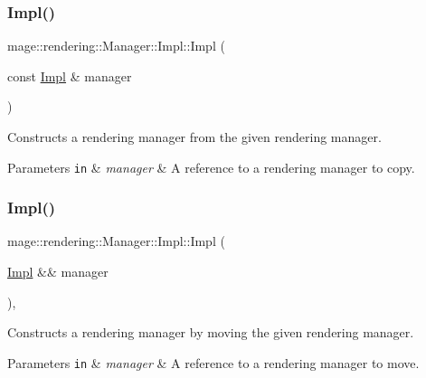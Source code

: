 \subsubsection{\texorpdfstring{Impl()}{Impl()}\hspace{0.1cm}{\footnotesize\ttfamily [2/3]}}
{\footnotesize\ttfamily mage\+::rendering\+::\+Manager\+::\+Impl\+::\+Impl (\begin{DoxyParamCaption}\item[{const \hyperlink{classmage_1_1rendering_1_1_manager_1_1_impl}{Impl} \&}]{manager }\end{DoxyParamCaption})\hspace{0.3cm}{\ttfamily [delete]}}

Constructs a rendering manager from the given rendering manager.


\begin{DoxyParams}[1]{Parameters}
\mbox{\tt in}  & {\em manager} & A reference to a rendering manager to copy. \\
\hline
\end{DoxyParams}
\hypertarget{classmage_1_1rendering_1_1_manager_1_1_impl_af9164e13dda6ab8b553e58c62ca79378}{}\label{classmage_1_1rendering_1_1_manager_1_1_impl_af9164e13dda6ab8b553e58c62ca79378} 
\subsubsection{\texorpdfstring{Impl()}{Impl()}\hspace{0.1cm}{\footnotesize\ttfamily [3/3]}}
{\footnotesize\ttfamily mage\+::rendering\+::\+Manager\+::\+Impl\+::\+Impl (\begin{DoxyParamCaption}\item[{\hyperlink{classmage_1_1rendering_1_1_manager_1_1_impl}{Impl} \&\&}]{manager }\end{DoxyParamCaption})\hspace{0.3cm}{\ttfamily [default]}, {\ttfamily [noexcept]}}

Constructs a rendering manager by moving the given rendering manager.


\begin{DoxyParams}[1]{Parameters}
\mbox{\tt in}  & {\em manager} & A reference to a rendering manager to move. \\
\hline
\end{DoxyParams}
\hypertarget{classmage_1_1rendering_1_1_manager_1_1_impl_a34e0d4635b02ea40cc01847d0e1a4fb7}{}\label{classmage_1_1rendering_1_1_manager_1_1_impl_a34e0d4635b02ea40cc01847d0e1a4fb7} 
